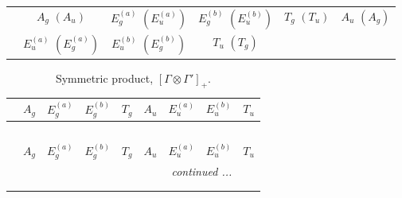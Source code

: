 \documentclass[fleqn,10pt,landscape]{article}
\begin{document}
\begin{itemize}
\begin{center}
\begin{longtable}{cccccc}
 & $ A_{g}\,\,(A_{u}) $ & $ E_{g}^{(a)}\,\,(E_{u}^{(a)}) $ & $ E_{g}^{(b)}\,\,(E_{u}^{(b)}) $ & $ T_{g}\,\,(T_{u}) $ & $ A_{u}\,\,(A_{g}) $ \\
& $ E_{u}^{(a)}\,\,(E_{g}^{(a)}) $ & $ E_{u}^{(b)}\,\,(E_{g}^{(b)}) $ & $ T_{u}\,\,(T_{g}) $ & $  $ & $  $ \\
\end{longtable}
\end{center}
\begin{center}
\renewcommand{\arraystretch}{1.0}
\begin{longtable}{c|cccccccc}
\caption{Symmetric product, $[\Gamma\otimes\Gamma']_+.$}
 \\
 \hline \hline
 & $ A_{g} $ & $ E_{g}^{(a)} $ & $ E_{g}^{(b)} $ & $ T_{g} $ & $ A_{u} $ & $ E_{u}^{(a)} $ & $ E_{u}^{(b)} $ & $ T_{u} $ \\ \hline \endfirsthead

\multicolumn{8}{l}{\tablename\ \thetable{}} \\
 \hline \hline
 & $ A_{g} $ & $ E_{g}^{(a)} $ & $ E_{g}^{(b)} $ & $ T_{g} $ & $ A_{u} $ & $ E_{u}^{(a)} $ & $ E_{u}^{(b)} $ & $ T_{u} $ \\ \hline \endhead

 \hline \hline
\multicolumn{8}{r}{\footnotesize\it continued ...} \\ \endfoot

 \hline \hline
\multicolumn{8}{r}{} \\ \endlastfoot


\end{longtable}
\end{center}
\end{itemize}
\end{document}

